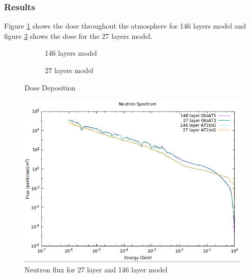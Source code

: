 \subsubsection{Results}
Figure \ref{146} shows the dose throughout the atmosphere for 146 layers model                
and figure \ref{27} shows the dose for the 27 layers model.      
\begin{figure}
\centering
\begin{subfigure}[b]{.45\textwidth}
\caption{146 layers model}
\label{146}
\end{subfigure}
%
\hspace{0.5cm}
%
\begin{subfigure}[b]{.45\textwidth}
\centering
{}
\caption{27 layers model}
\label{27}
\end{subfigure}
\caption{Dose Deposition}
\end{figure}

\begin{figure}
 \begin{centering}
 \centering
 \includegraphics[width=0.8\linewidth]{../figs/neutron.png}
 \caption{Neutron flux for 27 layer and 146 layer model}
 \label{neutron}
 \end{centering}
\end{figure}


